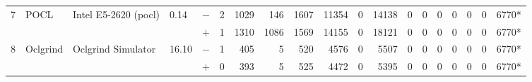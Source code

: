 \begin{tabular}{lllll | rrrrrrr | rrrrrrr }
\hline
\multirow{ 2}{*}{7} & \multirow{ 2}{*}{POCL} & \multirow{ 2}{*}{Intel E5-2620 (pocl)} & \multirow{ 2}{*}{0.14} & $-$ & 2 & 1029 & 146 & 1607 & 11354 & 0 & 14138 & 0 & 0 & 0 & 0 & 0 & 0 & 6770* \\& & & & $+$ & 1 & 1310 & 1086 & 1569 & 14155 & 0 & 18121 & 0 & 0 & 0 & 0 & 0 & 0 & 6770* \\
\hline
\multirow{ 2}{*}{8} & \multirow{ 2}{*}{Oclgrind} & \multirow{ 2}{*}{Oclgrind Simulator} & \multirow{ 2}{*}{16.10} & $-$ & 1 & 405 & 5 & 520 & 4576 & 0 & 5507 & 0 & 0 & 0 & 0 & 0 & 0 & 6770* \\& & & & $+$ & 0 & 393 & 5 & 525 & 4472 & 0 & 5395 & 0 & 0 & 0 & 0 & 0 & 0 & 6770* \\
  \bottomrule
\end{tabular}

